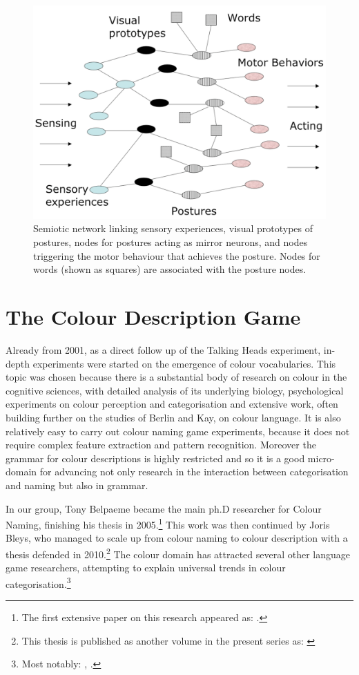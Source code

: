 \begin{figure}
\centerline{\includegraphics[width=0.6\linewidth]{chap11/figs/network.pdf}}
\caption{\label{network} Semiotic network linking sensory experiences, visual prototypes of postures, nodes for postures acting as mirror neurons, and nodes triggering the motor behaviour that achieves the posture. Nodes for words (shown as squares) 
are associated with the posture nodes.}
\end{figure}

\section{The Colour Description Game}

Already from 2001, as a direct follow up of the Talking Heads experiment, in-depth experiments were started on the emergence of 
colour vocabularies. This topic was chosen because 
there is a substantial body of research on colour in the cognitive sciences, with 
detailed analysis of its underlying biology, psychological experiments on colour perception and categorisation 
and extensive work, often building further on the studies of Berlin and Kay, on colour language. It is also 
relatively easy to carry out colour naming game experiments, because it does not require complex feature extraction 
and pattern recognition. Moreover the grammar for colour descriptions is highly restricted and so it is a good micro-domain for 
advancing not only research in the interaction between categorisation and naming but also in grammar. 

In our group, Tony Belpaeme became the main ph.D researcher for Colour Naming, finishing his thesis 
in 2005.\footnote{The first extensive paper on this research appeared as: \cite{Steels:2005}.}
This work was then continued by Joris Bleys, who managed to scale up from colour naming to colour description with 
a thesis defended in 2010.\footnote{This thesis is published as another volume in the present series as: \cite{Bleys:2014}}
The colour domain has attracted several other language game researchers, attempting to explain 
universal trends in colour categorisation.\footnote{Most notably: \cite{Puglisi:2008}, \cite{Baronchelli:2010}.}


